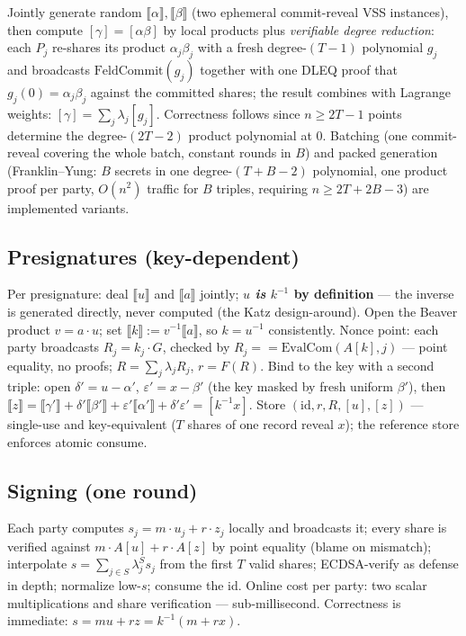 \documentclass[11pt]{article}
\theoremstyle{plain}
\theoremstyle{definition}
\theoremstyle{remark}
\newcommand{\share}[1]{[#1]}
\newcommand{\oshare}[1]{\llbracket #1 \rrbracket}
\newcommand{\EvalCom}{\mathrm{EvalCom}}
\begin{document}
Jointly generate random $\oshare{\alpha}, \oshare{\beta}$ (two ephemeral commit-reveal VSS instances), then compute $\share{\gamma} = \share{\alpha\beta}$ by local products plus \emph{verifiable degree reduction}: each $P_j$ re-shares its product $\alpha_j\beta_j$ with a fresh degree-$(T{-}1)$ polynomial $g_j$ and broadcasts $\mathrm{FeldCommit}(g_j)$ together with one DLEQ proof that $g_j(0) = \alpha_j\beta_j$ against the committed shares; the result combines with Lagrange weights: $\share{\gamma} = \sum_j \lambda_j \share{g_j}$. Correctness follows since $n \geq 2T{-}1$ points determine the degree-$(2T{-}2)$ product polynomial at 0. Batching (one commit-reveal covering the whole batch, constant rounds in $B$) and packed generation (Franklin--Yung: $B$ secrets in one degree-$(T{+}B{-}2)$ polynomial, one product proof per party, $O(n^2)$ traffic for $B$ triples, requiring $n \geq 2T + 2B - 3$) are implemented variants.

\subsection{Presignatures (key-dependent)}\label{sec:presign}

Per presignature: deal $\oshare{u}$ and $\oshare{a}$ jointly; \textbf{$u$ \emph{is} $k^{-1}$ by definition} --- the inverse is generated directly, never computed (the Katz design-around). Open the Beaver product $v = a \cdot u$; set $\oshare{k} := v^{-1}\oshare{a}$, so $k = u^{-1}$ consistently. Nonce point: each party broadcasts $R_j = k_j \cdot G$, checked by $R_j == \EvalCom(A\share{k}, j)$ --- point equality, no proofs; $R = \sum_j \lambda_j R_j$, $r = F(R)$. Bind to the key with a second triple: open $\delta' = u - \alpha'$, $\varepsilon' = x - \beta'$ (the key masked by fresh uniform $\beta'$), then $\oshare{z} = \oshare{\gamma'} + \delta'\oshare{\beta'} + \varepsilon'\oshare{\alpha'} + \delta'\varepsilon' = \share{k^{-1}x}$. Store $(\mathrm{id}, r, R, \share{u}, \share{z})$ --- single-use and key-equivalent ($T$ shares of one record reveal $x$); the reference store enforces atomic consume.

\subsection{Signing (one round)}\label{sec:sign}

Each party computes $s_j = m \cdot u_j + r \cdot z_j$ locally and broadcasts it; every share is verified against $m \cdot A\share{u} + r \cdot A\share{z}$ by point equality (blame on mismatch); interpolate $s = \sum_{j \in S} \lambda_j^S s_j$ from the first $T$ valid shares; ECDSA-verify as defense in depth; normalize low-$s$; consume the id. Online cost per party: two scalar multiplications and share verification --- sub-millisecond. Correctness is immediate: $s = m u + r z = k^{-1}(m + r x)$.
\end{document}
